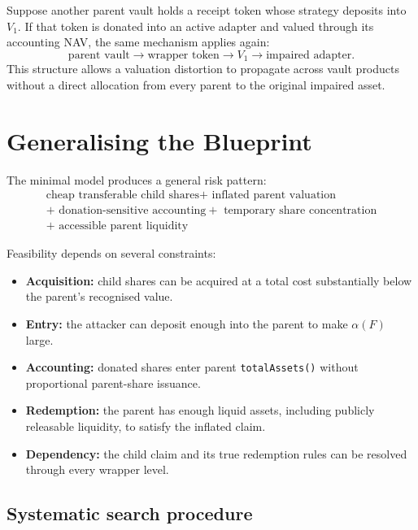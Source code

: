 \documentclass[11pt]{article}
\begin{document}
Suppose another parent vault holds a receipt token whose strategy deposits into $V_1$.  If that token is donated into an active adapter and valued through its accounting NAV, the same mechanism applies again:
\begin{equation}
    \text{parent vault}
    \longrightarrow \text{wrapper token}
    \longrightarrow V_1
    \longrightarrow \text{impaired adapter}.
\end{equation}
This structure allows a valuation distortion to propagate across vault products without a direct allocation from every parent to the original impaired asset.

\section{Generalising the Blueprint}

The minimal model produces a general risk pattern:
\begin{equation}
    \boxed{
    \begin{gathered}
    \text{cheap transferable child shares}
    +\text{ inflated parent valuation}\\
    +\text{ donation-sensitive accounting}
    +\text{ temporary share concentration}\\
    +\text{ accessible parent liquidity}
    \end{gathered}}
\end{equation}

Feasibility depends on several constraints:
\begin{itemize}[nosep]
    \item \textbf{Acquisition:} child shares can be acquired at a total cost substantially below the parent's recognised value.
    \item \textbf{Entry:} the attacker can deposit enough into the parent to make $\alpha(F)$ large.
    \item \textbf{Accounting:} donated shares enter parent \texttt{totalAssets()} without proportional parent-share issuance.
    \item \textbf{Redemption:} the parent has enough liquid assets, including publicly releasable liquidity, to satisfy the inflated claim.
    \item \textbf{Dependency:} the child claim and its true redemption rules can be resolved through every wrapper level.
\end{itemize}

\subsection{Systematic search procedure}
\end{document}
